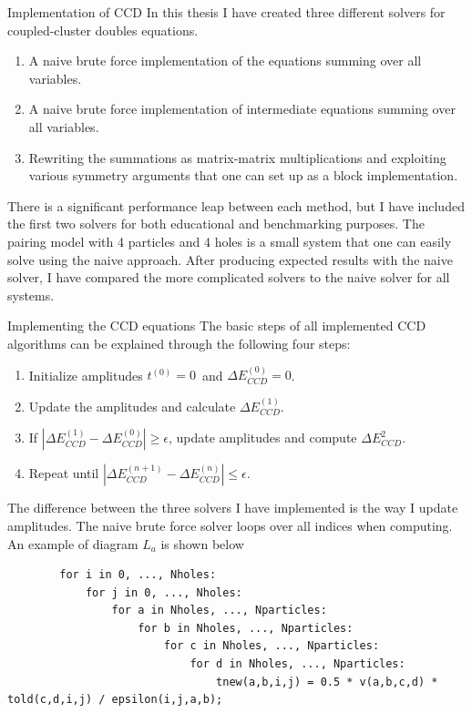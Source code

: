 \documentclass[twoside,english]{uiofysmaster}
\begin{document}
\begin{chapter}{Implementation of CCD}
	In this thesis I have created three different solvers for coupled-cluster doubles equations. 
	\begin{enumerate}
		\item A naive brute force implementation of the equations summing over all variables. 
		\item A naive brute force implementation of intermediate equations summing over all variables.
		\item Rewriting the summations as matrix-matrix multiplications and exploiting various symmetry arguments that one can set up as a block implementation.
	\end{enumerate}	
	There is a significant performance leap between each method,
        but I have included the first two solvers for both educational
        and benchmarking purposes. The pairing model with 4 particles
        and 4 holes is a small system that one can easily solve using
        the naive approach. After producing expected results with the
        naive solver, I have compared the more complicated solvers to
        the naive solver for all systems.

	\begin{section}{Implementing the CCD equations}
		The basic steps of all implemented CCD algorithms can
                be explained through the following four steps:
		\begin{enumerate}
			\item Initialize amplitudes $t^{(0)} = 0$ and $\Delta E_{CCD}^{(0)} = 0$.
			\item Update the amplitudes and calculate $\Delta E_{CCD}^{(1)}$.
			\item If $ |\Delta E_{CCD}^{(1)} - \Delta E_{CCD}^{(0)}| \geq \epsilon $, update amplitudes and compute $\Delta E_{CCD}^{2}$.
			\item Repeat until $ |\Delta E_{CCD}^{(n+1)} - \Delta E_{CCD}^{(n)}| \leq \epsilon $.
		\end{enumerate}
		The difference between the three solvers I have
                implemented is the way I update amplitudes. The naive
                brute force solver loops over all indices when
                computing. An example of diagram $L_a$ is shown below

		\begin{lstlisting}
		for i in 0, ..., Nholes:
			for j in 0, ..., Nholes:
				for a in Nholes, ..., Nparticles:
					for b in Nholes, ..., Nparticles:
						for c in Nholes, ..., Nparticles:
							for d in Nholes, ..., Nparticles:
								tnew(a,b,i,j) = 0.5 * v(a,b,c,d) * told(c,d,i,j) / epsilon(i,j,a,b);
		\end{lstlisting}


\end{section}
\end{chapter}
\end{document}
